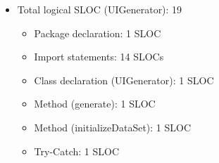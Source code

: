 \documentclass[12pt,letterpaper]{report}
\begin{document}
\begin{itemize}
   
    \item Total logical SLOC (UIGenerator): 19
    \\
    \begin{itemize}
    \item Package declaration: 1 SLOC
    \item Import statements: 14 SLOCs
    \item Class declaration (UIGenerator): 1 SLOC
    \item Method (generate): 1 SLOC
    \item Method (initializeDataSet): 1 SLOC
    \item Try-Catch: 1 SLOC
    \\
    \end{itemize}
\end{itemize}
\end{document}

